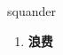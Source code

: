
\begin{frame}
{\huge squander}
\begin{center}
\begin{enumerate}\Large
  \item \textbf{浪费}
\end{enumerate}
\end{center}
\end{frame}
